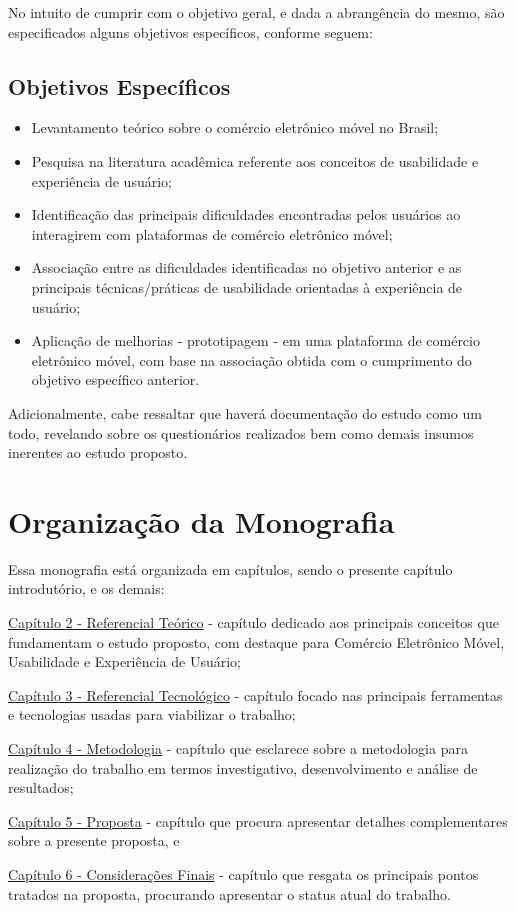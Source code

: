 No intuito de cumprir com o objetivo geral, e dada a abrangência do mesmo, são especificados alguns objetivos específicos, conforme seguem:

\subsection{Objetivos Específicos}
	\begin{itemize}
		\item Levantamento teórico sobre o comércio eletrônico móvel no Brasil;
        \item Pesquisa na literatura acadêmica referente aos conceitos de usabilidade e experiência de usuário;
        \item Identificação das principais dificuldades encontradas pelos usuários ao interagirem com plataformas de comércio eletrônico móvel;
        \item Associação entre as dificuldades identificadas no objetivo anterior e as principais técnicas/práticas de usabilidade orientadas à experiência de usuário;
        \item Aplicação de melhorias - prototipagem - em uma plataforma de comércio eletrônico móvel, com base na associação obtida com o cumprimento do objetivo específico anterior.
	\end{itemize} 

Adicionalmente, cabe ressaltar que haverá documentação do estudo como um todo, revelando sobre os questionários realizados bem como demais insumos inerentes ao estudo proposto.


\section{Organização da Monografia} \label{mono}
Essa monografia está organizada em capítulos, sendo o presente capítulo introdutório, e os demais:

\hyperref[chap:refteo]{Capítulo 2 - Referencial Teórico} - capítulo dedicado aos principais conceitos que fundamentam o estudo proposto, com destaque para Comércio Eletrônico Móvel, Usabilidade e Experiência de Usuário;

\hyperref[chap:refteo]{Capítulo 3 - Referencial Tecnológico} - capítulo focado nas principais ferramentas e tecnologias usadas para viabilizar o trabalho;

\hyperref[chap:met]{Capítulo 4 - Metodologia} - capítulo que esclarece sobre a metodologia para realização do trabalho em termos investigativo, desenvolvimento e análise de resultados;

\hyperref[chap:proposta]{Capítulo 5 - Proposta} - capítulo que procura apresentar detalhes complementares sobre a presente proposta, e

\hyperref[chap:status]{Capítulo 6 - Considerações Finais} - capítulo que resgata os principais pontos tratados na proposta, procurando apresentar o status atual do trabalho.